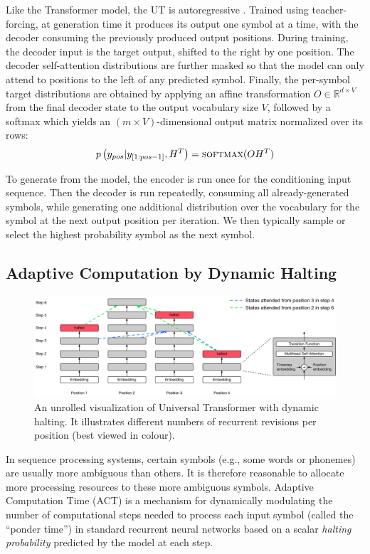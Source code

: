 Like the Transformer model, the UT is autoregressive \citep{graves2013generating}. Trained using teacher-forcing, at generation time it produces its output one symbol at a time, with the decoder consuming the previously produced output positions. During training, the decoder input is the target output, shifted to the right by one position.
The decoder self-attention distributions are further masked so that the model can only attend to positions to the left of any predicted symbol. Finally, the per-symbol target distributions are obtained by applying an affine transformation $O \in \mathbb{R}^{d \times V}$ from the final decoder state to the output vocabulary size $V$, followed by a softmax which yields an $(m \times V)$-dimensional output matrix normalized over its rows:
\begin{equation}
 p\left(y_{pos} | y_{[1:pos - 1]}, H^T\right) = \textsc{softmax}(OH^T)
\end{equation}

To generate from the model, the encoder is run once for the conditioning input sequence. Then the decoder is run repeatedly, consuming all already-generated symbols, while generating one additional distribution over the vocabulary for the symbol at the next output position per iteration. We then typically sample or select the highest probability symbol as the next symbol.


\subsection{Adaptive Computation by Dynamic Halting}
\label{sec:dynamic-halting}
\begin{figure}
 \centering
 \includegraphics[width=1.0\textwidth]{04-part-03/chapter-06/figs_and_tables/fig_adaptive-universal-transformer.pdf}
 \caption{An unrolled visualization of Universal Transformer with dynamic halting. It illustrates different numbers of recurrent revisions per position (best viewed in colour).}
 \label{fig:adaptive_ut}
\end{figure}
In sequence processing systems, certain symbols (e.g., some words or phonemes) are usually more ambiguous than others. It is therefore reasonable to allocate more processing resources to these more ambiguous symbols. Adaptive Computation Time (ACT) \citep{graves2016adaptive} is a mechanism for dynamically modulating the number of computational steps needed to process each input symbol (called the ``ponder time'') in standard recurrent neural networks based on a scalar \emph{halting probability} predicted by the model at each step.

